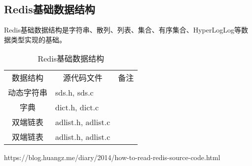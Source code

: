 \documentclass[../../../interview-questions.tex]{subfiles}
\begin{document}
\subsection{Redis基础数据结构}

Redis基础数据结构是字符串、散列、列表、集合、有序集合、HyperLogLog等数据类型实现的基础。

\begin{table}[htbp]
	\caption{Redis基础数据结构}
	\label{table:redisdatastructure}
	\begin{center}
		\begin{tabular}{cp{4cm}c}
			\hline
			\multirow{1}{*}{数据结构}
			& \multicolumn{1}{c}{源代码文件} 
			& \multicolumn{1}{c}{备注}\\			
			\cline{1-3}
			动态字符串 & sds.h, sds.c  &   \\
			\hline
			字典 & dict.h, dict.c &  \\
			\hline
			双端链表 & adlist.h, adlist.c &  \\
			\hline
            双端链表 &  adlist.h, adlist.c &  \\
			\hline							
		\end{tabular}	
	\end{center}
\end{table}

https://blog.huangz.me/diary/2014/how-to-read-redis-source-code.html
\end{document}
